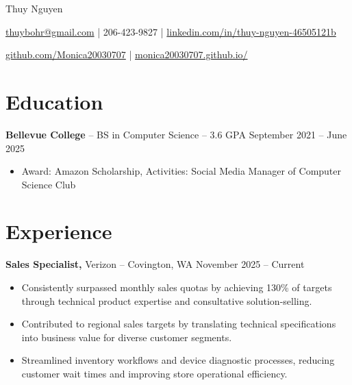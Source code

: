 \documentclass[11pt]{article}       %
\begin{document}
\centerline{\Huge Thuy Nguyen}

\vspace{5pt}

\centerline{\href{mailto:thuybohr@gmail.com}{thuybohr@gmail.com} | 206-423-9827 |
\href{https://www.linkedin.com/in/thuy-nguyen-46505121b/}{linkedin.com/in/thuy-nguyen-46505121b}}

\centerline{\href{https://github.com/Monica20030707}{github.com/Monica20030707} | 
\href{https://monica20030707.github.io/}{monica20030707.github.io/}} 

\vspace{-9pt}

\section*{Education}
\textbf{Bellevue College} -- BS in Computer Science -- 3.6 GPA \hfill September 2021 -- June 2025\\
\vspace{-9pt}
\begin{itemize}
  \item Award: Amazon Scholarship, Activities: Social Media Manager of Computer Science Club
\end{itemize}

\vspace{-18.5pt}

\section*{Experience}

\textbf{Sales Specialist,} {Verizon} -- Covington, WA \hfill November 2025 -- Current \\
\vspace{-9pt}
\begin{itemize}
  \item Consistently surpassed monthly sales quotas by achieving 130\% of targets through technical product expertise and consultative solution-selling.
  \item Contributed to regional sales targets by translating technical specifications into business value for diverse customer segments.
  \item Streamlined inventory workflows and device diagnostic processes, reducing customer wait times and improving store operational efficiency.
\end{itemize}
\end{document}

